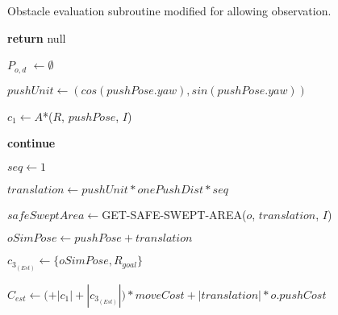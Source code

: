 \begin{algorithm}[H]

  \caption{Obstacle evaluation subroutine modified for allowing observation.}

  \label{alg:04-custom-observation-planforobstacle}

  \begin{algorithmic}[1]


        \State \textbf{return} null
      \EndIf

      \State $P_{o,d}$ $\gets \emptyset$

        \State $pushUnit \gets (cos(pushPose.yaw), sin(pushPose.yaw))$

        \State $c_{1} \gets A$*($R$, $pushPose$, $I$)

          \State \textbf{continue}
        \EndIf

        \State {}


          \State {}

            \State {}
          \Else
            \State {}

              \State {}
            \EndIf
          \EndIf
        \EndIf

        \State $seq \gets 1$

        \State $translation \gets pushUnit * onePushDist * seq$

        \State $safeSweptArea \gets $GET-SAFE-SWEPT-AREA($o$, $translation$, $I$)

        \State $oSimPose \gets pushPose + translation$

        \State $c_{3_{(Est)}} \gets \{oSimPose, R_{goal}\}$

        \State $C_{est} \gets ($$ + |c_{1}| + |c_{3_{(Est)}}|) * moveCost + |translation| * o.pushCost$


\end{algorithmic}
\end{algorithm}
